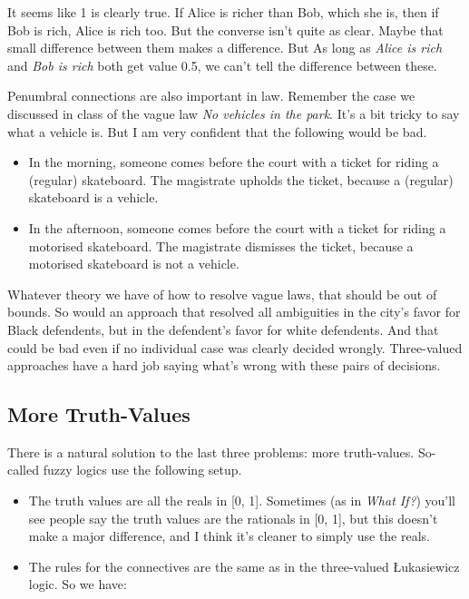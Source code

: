 \documentclass[
]{article}
\providecommand{\tightlist}{%
  \setlength{\itemsep}{0pt}\setlength{\parskip}{0pt}}\usepackage{longtable,booktabs,array}
\begin{document}
It seems like 1 is clearly true. If Alice is richer than Bob, which she
is, then if Bob is rich, Alice is rich too. But the converse isn't quite
as clear. Maybe that small difference between them makes a difference.
But As long as \emph{Alice is rich} and \emph{Bob is rich} both get
value 0.5, we can't tell the difference between these.

Penumbral connections are also important in law. Remember the case we
discussed in class of the vague law \emph{No vehicles in the park}. It's
a bit tricky to say what a vehicle is. But I am very confident that the
following would be bad.

\begin{itemize}
\tightlist
\item
  In the morning, someone comes before the court with a ticket for
  riding a (regular) skateboard. The magistrate upholds the ticket,
  because a (regular) skateboard is a vehicle.
\item
  In the afternoon, someone comes before the court with a ticket for
  riding a motorised skateboard. The magistrate dismisses the ticket,
  because a motorised skateboard is not a vehicle.
\end{itemize}

Whatever theory we have of how to resolve vague laws, that should be out
of bounds. So would an approach that resolved all ambiguities in the
city's favor for Black defendents, but in the defendent's favor for
white defendents. And that could be bad even if no individual case was
clearly decided wrongly. Three-valued approaches have a hard job saying
what's wrong with these pairs of decisions.

\hypertarget{more-truth-values}{%
\subsection{More Truth-Values}\label{more-truth-values}}

There is a natural solution to the last three problems: more
truth-values. So-called fuzzy logics use the following setup.

\begin{itemize}
\tightlist
\item
  The truth values are all the reals in {[}0, 1{]}. Sometimes (as in
  \emph{What If?}) you'll see people say the truth values are the
  rationals in {[}0, 1{]}, but this doesn't make a major difference, and
  I think it's cleaner to simply use the reals.
\item
  The rules for the connectives are the same as in the three-valued
  Łukasiewicz logic. So we have:
\end{itemize}
\end{document}
